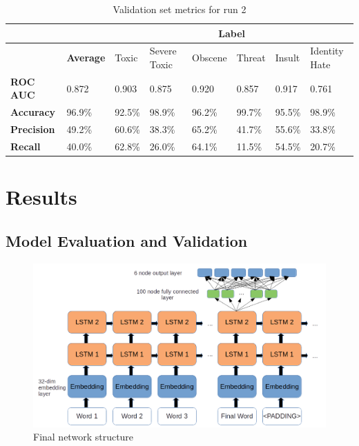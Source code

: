 \documentclass[12pt]{article}
\begin{document}
\begin{center}
\begin{table}
\begin{tabular}{| m{5em} | m{1.5cm} | m{1.5cm} | m{1.5cm} | m{1.5cm} | m{1.5cm} | m{1.5cm} | m{1.5cm} |}
\hline
\multicolumn{2}{|c}{} & \multicolumn{6}{c|}{Label} \\
\hline
& \textbf{Average} & Toxic & Severe Toxic & Obscene & Threat & Insult & Identity Hate \\
\hline
\textbf{ROC AUC} & 0.872 & 0.903 & 0.875 & 0.920 & 0.857 & 0.917 & 0.761 \\
\hline
\textbf{Accuracy} & 96.9\% & 92.5\% & 98.9\% & 96.2\% & 99.7\% & 95.5\% & 98.9\% \\
\hline
\textbf{Precision} & 49.2\% & 60.6\% & 38.3\% & 65.2\% & 41.7\% & 55.6\% & 33.8\% \\
\hline
\textbf{Recall} & 40.0\% & 62.8\% & 26.0\% & 64.1\% & 11.5\% & 54.5\% & 20.7\% \\
\hline
\end{tabular}
\caption{Validation set metrics for run 2}
\label{table:2}
\end{table}
\end{center}


\section*{Results}
\label{sec:orgb2a955a}

\subsection*{Model Evaluation and Validation}
\label{sec:org17f2faf}
\begin{figure}
\centering
\includegraphics[width=\textwidth]{network}
\caption{Final network structure}
\label{fig:network}
\end{figure}
\end{document}
